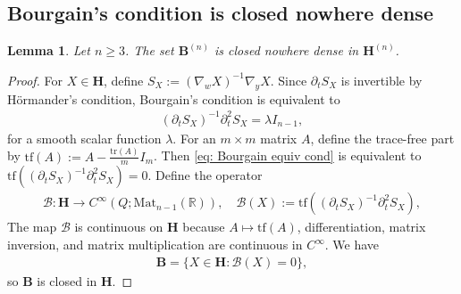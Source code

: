 \documentclass[reqno,11pt]{amsart}
\numberwithin{equation}{section}
\numberwithin{figure}{section}
\def\R{\mathbb{R}}
\renewcommand\geq{\geqslant}
\theoremstyle{plain}
\newtheorem{lemma}[thm]{Lemma}
\theoremstyle{definition}
\begin{document}
    \subsection{Bourgain's condition is closed nowhere dense}

    \begin{lemma}\label{lem: thm: density part 2}
        Let $n \geq 3$. The set $\mathbf B^{(n)}$ is closed nowhere dense in $\mathbf H^{(n)}$.
    \end{lemma}

    \begin{proof}
        For $X \in \mathbf H$, define $S_X :=(\nabla_w X)^{-1} \nabla_y X$.
        Since $\partial_t S_X$ is invertible by H\"ormander's condition, Bourgain's condition is equivalent to 
        \begin{align} \label{eq: Bourgain equiv cond}
            (\partial_t S_X)^{-1} \partial_t^2 S_X = \lambda I_{n-1},
        \end{align}
        for a smooth scalar function $\lambda$.
        For an $m \times m$ matrix $A$, define the trace-free part by
        $\mathrm{tf}(A) :=A - \frac{\mathrm{tr}(A)}{m} I_m$. Then \eqref{eq: Bourgain equiv cond} is equivalent to $\mathrm{tf}((\partial_t S_X)^{-1} \partial_t^2 S_X)=0$. Define the operator
        \begin{align}
            \mathcal B : \mathbf H \to C^\infty(Q;\mathrm{Mat}_{n-1}(\R)), \quad \mathcal B(X):=\mathrm{tf}((\partial_t S_X)^{-1} \partial_t^2 S_X),
        \end{align}
        The map $\mathcal B$ is continuous on $\mathbf H$ because $A \mapsto \mathrm{tf}(A)$, differentiation, matrix inversion, and matrix multiplication are continuous in $C^\infty$. We have 
        \begin{align}
            \mathbf B = \{X \in \mathbf H : \mathcal B(X) = 0\},
        \end{align}
        so $\mathbf B$ is closed in $\mathbf H$. 
        


\end{proof}
\end{document}
